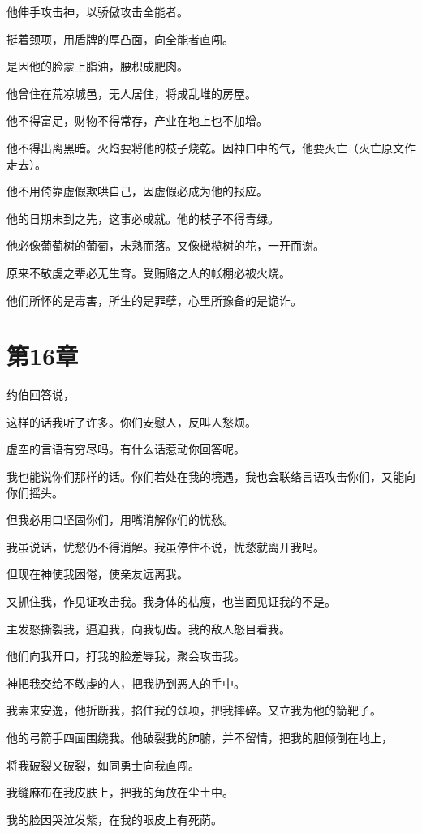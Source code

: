 \documentclass[12pt,oneside]{book}
\begin{document}
他伸手攻击神，以骄傲攻击全能者。

挺着颈项，用盾牌的厚凸面，向全能者直闯。

是因他的脸蒙上脂油，腰积成肥肉。

他曾住在荒凉城邑，无人居住，将成乱堆的房屋。

他不得富足，财物不得常存，产业在地上也不加增。

他不得出离黑暗。火焰要将他的枝子烧乾。因神口中的气，他要灭亡（灭亡原文作走去）。

他不用倚靠虚假欺哄自己，因虚假必成为他的报应。

他的日期未到之先，这事必成就。他的枝子不得青绿。

他必像葡萄树的葡萄，未熟而落。又像橄榄树的花，一开而谢。

原来不敬虔之辈必无生育。受贿赂之人的帐棚必被火烧。

他们所怀的是毒害，所生的是罪孽，心里所豫备的是诡诈。



\chapter{第16章}
约伯回答说，

这样的话我听了许多。你们安慰人，反叫人愁烦。

虚空的言语有穷尽吗。有什么话惹动你回答呢。

我也能说你们那样的话。你们若处在我的境遇，我也会联络言语攻击你们，又能向你们摇头。

但我必用口坚固你们，用嘴消解你们的忧愁。

我虽说话，忧愁仍不得消解。我虽停住不说，忧愁就离开我吗。

但现在神使我困倦，使亲友远离我。

又抓住我，作见证攻击我。我身体的枯瘦，也当面见证我的不是。

主发怒撕裂我，逼迫我，向我切齿。我的敌人怒目看我。

他们向我开口，打我的脸羞辱我，聚会攻击我。

神把我交给不敬虔的人，把我扔到恶人的手中。

我素来安逸，他折断我，掐住我的颈项，把我摔碎。又立我为他的箭靶子。

他的弓箭手四面围绕我。他破裂我的肺腑，并不留情，把我的胆倾倒在地上，

将我破裂又破裂，如同勇士向我直闯。

我缝麻布在我皮肤上，把我的角放在尘土中。

我的脸因哭泣发紫，在我的眼皮上有死荫。
\end{document}
